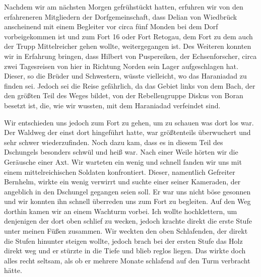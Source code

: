 Nachdem wir am nächsten Morgen gefrühstückt hatten, erfuhren wir von den erfahreneren Mitgliedern der Dorfgemeinschaft, dass Delian von Wiedbrück anscheinend mit einem Begleiter vor circa fünf Monden bei dem Dorf vorbeigekommen ist und zum Fort 16 oder Fort Retogau, dem Fort zu dem auch der Trupp Mittelreicher gehen wollte, weitergegangen ist. Des Weiteren konnten wir in Erfahrung bringen, dass Hilbert von Puspereiken, der Echsenforscher, circa zwei Tagesreisen von hier in Richtung Norden sein Lager aufgeschlagen hat. Dieser, so die Brüder und Schwestern, wüsste vielleicht, wo das Haraniadad zu finden sei. Jedoch sei die Reise gefährlich, da das Gebiet links von dem Bach, der den größten Teil des Weges bildet, von der Rebellengruppe Diskus von Boran besetzt ist, die, wie wir wussten, mit dem Haraniadad verfeindet sind.

Wir entschieden uns jedoch zum Fort zu gehen, um zu schauen was dort los war. Der Waldweg der einst dort hingeführt hatte, war größtenteils überwuchert und sehr schwer wiederzufinden. Noch dazu kam, dass es in diesem Teil des Dschungels besonders schwül und heiß war. Nach einer Weile hörten wir die Geräusche einer Axt. Wir warteten ein wenig und schnell fanden wir uns mit einem mittelreichischen Soldaten konfrontiert. Dieser, namentlich Gefreiter Bernhelm, wirkte ein wenig verwirrt und suchte einer seiner Kameraden, der angeblich in den Dschungel gegangen seien soll. Er war uns nicht böse gesonnen und wir konnten ihn schnell überreden uns zum Fort zu begleiten. Auf den Weg dorthin kamen wir an einem Wachturm vorbei. Ich wollte hochklettern, um denjenigen der dort oben schlief zu wecken, jedoch krachte direkt die erste Stufe unter meinen Füßen zusammen. Wir weckten den oben Schlafenden, der direkt die Stufen hinunter steigen wollte, jedoch brach bei der ersten Stufe das Holz direkt weg und er stürzte in die Tiefe und blieb reglos liegen. Das wirkte doch alles recht seltsam, als ob er mehrere Monate schlafend auf den Turm verbracht hätte. 

